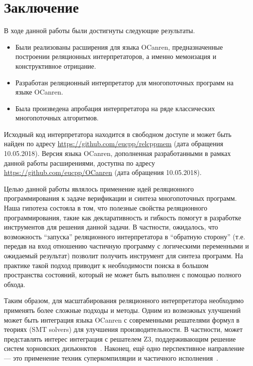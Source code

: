 \section*{Заключение}

В ходе данной работы были достигнуты следующие результаты.

\begin{itemize}
\item Были реализованы расширения для языка OCanren, 
    предназначенные построении реляционных интерпретаторов,
    а именно мемоизация и конструктивное отрицание.
\item Разработан реляционный интерпретатор для многопоточных программ на языке OCanren.
\item Была произведена апробация интерпретатора на ряде классических многопоточных алгоритмов.
\end{itemize}

Исходный код интерпретатора находится в свободном доступе и 
может быть найден по адресу \url{https://github.com/eucpp/relcppmem} (дата обращения 10.05.2018).
Версия языка OCanren, дополненная разработанными в рамках данной работы расширениями,
доступна по адресу \url{https://github.com/eucpp/OCanren} (дата обращения 10.05.2018).

Целью данной работы являлось применение идей реляционного программирования 
к задаче верификации и синтеза многопоточных программ.
Наша гипотеза состояла в том, что полезные свойства 
реляционного программирования, такие как декларативность и гибкость
помогут в разработке инструментов для решения данной задачи.
В частности, ожидалось, что возможность ``запуска'' реляционного интерпретатора
в ``обратную сторону'' (т.е. передав на вход отношению частичную программу с 
логическими переменными и ожидаемый результат) 
позволит получить инструмент для синтеза программ. 
На практике такой подход приводит к необходимости поиска в  
большом пространства состояний, 
который не может быть выполнен с помощью полного обхода. 

Таким образом, для масштабирования реляционного интерпретатора 
необходимо применять более сложные подходы и методы.
Одним из возможных улучшений может быть интеграция языка OCanren 
с современными решателями формул в теориях (SMT solvers)
для улучшения производительности. 
В частности, может представлять интерес 
интеграция с решателем Z3, поддерживающим решение систем
хорновских дизъюнктов~\cite{hoder2012generalized, bjorner2013solving}.
Наконец, ещё одно перспективное направление --- это применение техник суперкомпиляции и
частичного исполнения~\cite{jones1993partial, pettorossi1999synthesis}.

